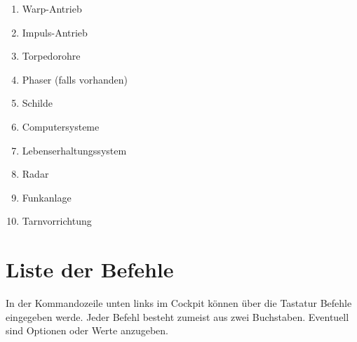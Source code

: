 \begin{center}
\begin{enumerate}
\item Warp-Antrieb
\item Impuls-Antrieb
\item Torpedorohre
\item Phaser (falls vorhanden)
\item Schilde
\item Computersysteme
\item Lebenserhaltungssystem
\item Radar
\item Funkanlage
\item Tarnvorrichtung
\end{enumerate}
\end{center}


\section{Liste der Befehle}

In der Kommandozeile unten links im Cockpit
k\"onnen \"uber die Tastatur Befehle eingegeben werde. Jeder Befehl besteht
zumeist aus zwei Buchstaben. Eventuell sind Optionen oder Werte anzugeben.


